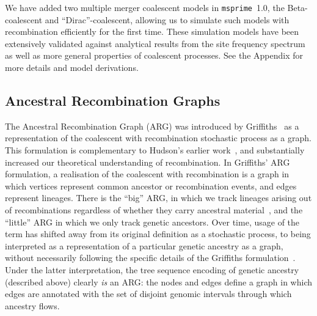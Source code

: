 \documentclass{article}
\newcommand{\msprime}[0]{\texttt{msprime}}
\begin{document}
We have added two multiple merger coalescent models in \msprime\ 1.0, the
Beta-coalescent and ``Dirac''-coalescent, allowing us to simulate
such models with recombination efficiently for the first time.
These simulation models have been extensively validated against
analytical results from the site frequency
spectrum~\citep{birkner2013statistical,blath2016site,hobolth2019phase}
 as well as more general properties of coalescent processes.
See the Appendix for more details and model derivations.

\subsection*{Ancestral Recombination Graphs}
\label{sec-arg}

The Ancestral Recombination Graph (ARG) was introduced by
Griffiths~\citep{griffiths1991two,griffiths1997ancestral}
as a representation of the coalescent with recombination
stochastic process as a graph.
This formulation is complementary to Hudson's earlier
work~\citep{hudson1983properties}, and substantially increased our theoretical
understanding of recombination. In Griffiths' ARG formulation,
a realisation of the coalescent with recombination is a graph in which
vertices represent common ancestor or recombination events, and edges represent
lineages. There is the ``big'' ARG, in which we track lineages arising out of
recombinations regardless of whether they carry ancestral
material~\citep{ethier1990two},
and the ``little'' ARG in which we only track genetic ancestors.
Over time, usage of the term
has shifted away from its original definition as a stochastic process,
to being interpreted as a representation of a particular genetic ancestry
as a graph, without necessarily following the specific details of the Griffiths
formulation~\citep[e.g.][]{minichiello2006mapping,mathieson2020ancestry}.
Under the latter interpretation,
the tree sequence encoding of genetic ancestry (described above)
clearly \emph{is} an ARG: the nodes and edges
define a graph in which edges are annotated with the
set of disjoint genomic intervals
through which ancestry flows.
\end{document}
